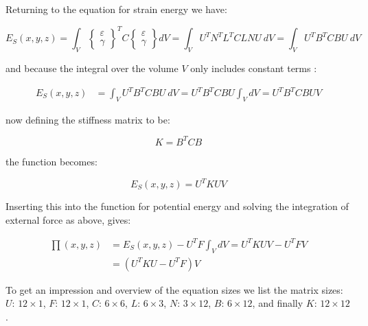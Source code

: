 Returning to the equation for strain energy we have:

\begin{equation}
E_S (x,y,z)
= \int_V
\begin{Bmatrix}
\varepsilon \\
\gamma
\end{Bmatrix}
^T C
\begin{Bmatrix}
\varepsilon \\
\gamma
\end{Bmatrix}
dV = \int_V U^T N^T L^T C L N U \ dV
= \int_V U^T B^T C B U \ dV
\end{equation}

and because the integral over the volume $V$ only includes constant
terms :

\begin{equation}
\begin{aligned}
E_S (x,y,z) 
&= \int_V U^T B^T C B U \ dV 
= U^T B^T C B U \int_V dV
= U^T B^T C B U V 
\end{aligned}
\end{equation}

now defining the stiffness matrix to be:

\begin{equation}
K = B^T C B
\end{equation}

the function becomes:

\begin{equation}
E_S (x,y,z) = U^T K U V
\end{equation}

Inserting this into the function for potential energy and solving
the integration of external force as above, gives:

\begin{equation}
\begin{aligned}
\label{eq:linear-sys-eq}
\prod (x,y,z)
&= E_S(x,y,z) - U^T F \int_V dV
= U^T K U V - U^T F V \\
&= (U^T K U - U^T F) V
\end{aligned}
\end{equation}

To get an impression and overview of the equation sizes we list the
matrix sizes: $U$: $12 \times 1$, $F$: $12 \times 1$, $C$: $6 \times
6$, $L$: $6 \times 3$, $N$: $3 \times 12$,
$B$: $6 \times 12$, and finally $K$: $12 \times 12$.


